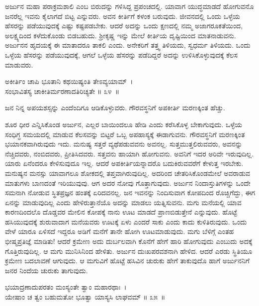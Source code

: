 ಅರ್ಜುನ ಮಹಾ ಪರಾಕ್ರಮಶಾಲಿ ಎಂಬ ಬಿರುದನ್ನು ಗಳಿಸಿದ್ದ ಪ್ರಪಂಚದಲ್ಲಿ. ಯಾವಾಗ ಯುದ್ಧಮಾಡದೆ ಹೋಗುವನೊ ಜನರೆಲ್ಲ ಇವನು ಕೈಲಾಗದೆ ಬಿಟ್ಟ ಎನ್ನುವರು. ಅವನ ಕೀರ್ತಿಗೆ ಕಳಂಕ ಬರುವುದು. ಜೀವನದಲ್ಲಿ ಒಂದು ಒಳ್ಳೆಯ ಹೆಸರನ್ನು ಪಡೆಯುವುದಕ್ಕೆ ಎಷ್ಟು ಕಷ್ಟಪಡಬೇಕು. ಆದರೆ ಅದನ್ನು ಒಂದು ಕ್ಷಣದಲ್ಲಿ ನಮ್ಮ ಅಜಾಗರೂಕತೆಯಿಂದ, ಅಲಕ್ಷ್ಯದಿಂದ ಕಳೆದುಕೊಂಡು ಬಿಡಬಹುದು. ಶ‍್ರೀಕೃಷ್ಣ ಇನ್ನು ಮೇಲೆ ಕೀರ್ತಿಯ ದೃಷ್ಟಿಯಿಂದ ಮಾತನಾಡುವನು. ಅರ್ಜುನನ ಹೃದಯಕ್ಕೆ ಈ ಮಾತಾದರೂ ತಾಕಲಿ ಎಂದು. ಅನೇಕರಿಗೆ ತತ್ತ್ವ ತಿಳಿಯದು, ಸ್ವಧರ್ಮ ತಿಳಿಯದು. ಒಂದು ಒಳ್ಳೆಯ ಹೆಸರನ್ನು ಪಡೆಯುವುದಕ್ಕೆ, ಆಗಲೆ ಒಳ್ಳೆಯ ಹೆಸರನ್ನು ಪಡೆದಿದ್ದರೆ ಅದನ್ನು ಉಳಿಸಿಕೊಳ್ಳುವುದಕ್ಕೆ ಕೆಲಸ ಮಾಡುವರು.

\begin{shloka}
ಅಕೀರ್ತಿಂ ಚಾಪಿ ಭೂತಾನಿ ಕಥಯಿಷ್ಯಂತಿ ತೇಽವ್ಯಯಾಮ್~।\\ಸಂಭಾವಿತಸ್ಯ ಚಾಕೀತಿರ್ಮರಣಾದತಿರಿಚ್ಯತೇ \hfill॥ ೩೪~॥
\end{shloka}

\begin{artha}
ಜನ ನಿನ್ನ ಅಪಯಶಸ್ಸನ್ನು ಎಂದೆಂದಿಗೂ ಆಡಿಕೊಳ್ಳುವರು. ಗೌರವಸ್ಥನಿಗೆ ಅಪಕೀರ್ತಿ ಮರಣಕ್ಕಿಂತ ಹೆಚ್ಚು.
\end{artha}

ಶೂರ ಧೀರ ಎನ್ನಿಸಿಕೊಂಡ ಅರ್ಜುನ, ಎಲ್ಲರ ಬಾಯಿಂದಲೂ ಹೇಡಿ ಎಂದು ಕರೆಸಿಕೊಳ್ಳ ಬೇಕಾಗುವುದು. ಒಳ್ಳೆಯ ಸಂಧಿಗ್ಧ ಸಮಯದಲ್ಲಿ ಮಾಡುವ ಕೆಲಸವನ್ನು ಬಿಟ್ಟರೆ ಒಬ್ಬ ಅಪಹಾಸ್ಯಕ್ಕೆ ಈಡಾಗುವನು. ಗೌರವಸ್ಥನಿಗೆ ಮರಣಕ್ಕಿಂತ ಭಯಾನಕವಾಗಿರುವುದು ಇದು. ಮನುಷ್ಯ ಸತ್ತರೆ ವ್ಯಥೆಪಡುವವನು ಅವನಲ್ಲ. ಸುತ್ತಮುತ್ತಲಿರುವವರು, ಅವನನ್ನು ನೆಚ್ಚಿದವರು, ನಂಬಿದವರು, ಪ್ರೀತಿಸಿದವರು. ಸತ್ತವನು ಹಾಯಾಗಿ ಹೋಗುವನು. ಅವನಿಗೆ ಇದರ ಅರಿವೇ ಇರುವುದಿಲ್ಲ. ಯಾರು ಏನೆಂದರೂ ಕೇಳಿಸುವುದೂ ಇಲ್ಲ. ಆದರೆ ಅಪಕೀರ್ತಿಯನ್ನಾದರೊ ಬದುಕಿರುವವರೆಗೆ ಕೇಳುತ್ತ ಇರಬೇಕು. ಮನುಷ್ಯನ ಮನಸ್ಸು ಯಾವಾಗಲೂ ಶೋಕದಲ್ಲಿ ತಪ್ತವಾಗಿರುವುದಿಲ್ಲ. ಅದರಿಂದ ಚೇತರಿಸಿಕೊಂಡಮೇಲೆ ಅವರಾಡುವ ಮಾತುಗಳು ಬಾಣದಂತೆ ಇರಿಯುವುವು. ಆಗ ಅದರ ನೋವು ಗೊತ್ತಾಗುವುದು. ಅರ್ಜುನ ನಿಂದಾಸ್ತುತಿಗಳನ್ನು ಒಂದೇ ಸಮನಾಗಿ ನೋಡುವ ಸ್ಥಿತಪ್ರಜ್ಞನ ಹಂತಕ್ಕೆ ಏರಿದವನಲ್ಲ. ಜನ ಇವನನ್ನು ನಿಂದಿಸುವಾಗ ಕೋಪದಿಂದ ರೊಚ್ಚಿಗೆದ್ದು, ಈಗ ಏನನ್ನು ಮಾಡುವುದಿಲ್ಲ ಎಂದು ಹೇಳಿರುತ್ತಾನೆಯೊ ಅದನ್ನು ಮಾಡಲು ಯತ್ನಿಸುವನು. ಮಗು ಮನೆಯಲ್ಲಿ ಯಾವ ಕಾರಣದಿಂದಲೊ ದೊಡ್ಡವರ ಮೇಲಿನ ಕೋಪಕ್ಕೆ ನಾನು ಊಟ ಮಾಡದೆ ಪ್ರಾಣಬಿಡುತ್ತೇನೆ ಎನ್ನುವುದು. ಹೊಟ್ಟೆ ಹಸಿಯುವುದಕ್ಕೆ ಶುರುವಾದಾಗ ಮನೆಯವರು ಊಟಕ್ಕೆ ಏಳು ಎಂದರೆ ಸಾಕು ಎಂದು ಕಾದು ಕುಳಿತಿರುವುದು. ಒಂದು ವೇಳೆ ಯಾರೂ ಏಳಿಸದೆ ಇದ್ದರೂ ಅಡಿಗೆ ಮನೆಗೆ ತಾನೇ ಹೋಗಿ ಊಟಮಾಡುವುದು. ಮಗು ಬೆಳಿಗ್ಗೆ ಎಂತಹ ಭೀಷ್ಮಪ್ರತಿಜ್ಞೆ ಮಾಡಿತು! ಆದರೆ ಕ್ರಮೇಣ ಅದು ದುರ್ಬಲವಾಗಿ ಕೊನೆಗೆ ಹೇಗೆ ಹಾರಿ ಹೋಗುವುದು ಎಂಬುದು ಅದಕ್ಕೆ ಗೊತ್ತಿರುವುದಿಲ್ಲ. ಆ ಮಗು ಮುನಿಸಿನಿಂದ ಹೇಳಿತು. ಅರ್ಜುನ ದುಃಖಪರವಶನಾಗಿ ಹೇಳಿದ. ಆದರೆ ಎರಡು ಸ್ಥಿತಿಯೂ ಕ್ರಮೇಣ ಬದಲಾವಣೆ ಆಗುವುದು. ಆ ಮಗುವಿಗೆ ಹೊಟ್ಟೆ ಹಸಿವಿನ ಚುರುಕು ಹೇಗೆ ತಾಕುವುದೊ ಹಾಗೆ ಅರ್ಜುನನಿಗೆ ಜನರ ನಿಂದೆಯ ಚುರುಕು ತಾಗುವುದು.

\begin{shloka}
ಭಯಾದ್ರಣಾದುಪರತಂ ಮಂಸ್ಯಂತೇ ತ್ವಾಂ ಮಹಾರಥಾಃ~।\\ಯೇಷಾಂ ಚ ತ್ವಂ ಬಹುಮತೋ ಭೂತ್ವಾ ಯಾಸ್ಯಸಿ ಲಾಘವಮ್ \hfill॥ ೩೫~॥
\end{shloka}


